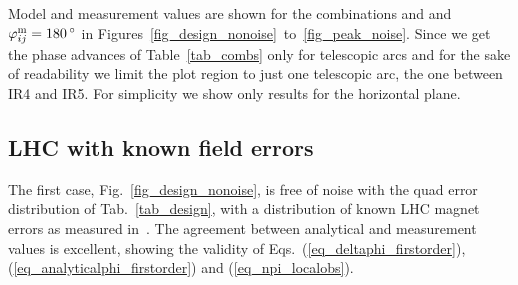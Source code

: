 Model and measurement values are shown for the combinations  and
 and $\varphi_{ij}^\text{m} = \SI{180}{^\circ}$ in Figures~\ref{fig_design_nonoise}~to~\ref{fig_peak_noise}.
Since we get the phase advances of Table~\ref{tab_combs} only for telescopic arcs and for the sake
of readability we limit the plot region to just one telescopic arc, the one between IR4 and IR5.
For simplicity we show only results for the horizontal plane. 


\subsection{LHC with known field errors}

The first case, Fig.~\ref{fig_design_nonoise}, is free of noise with the quad error distribution of
Tab.~\ref{tab_design}, with a distribution of known LHC magnet errors as measured in~\cite{wise1,wise2}.
The agreement between analytical and measurement values is excellent, showing the validity of
Eqs.~(\ref{eq_deltaphi_firstorder}), (\ref{eq_analyticalphi_firstorder}) and (\ref{eq_npi_localobs}).

